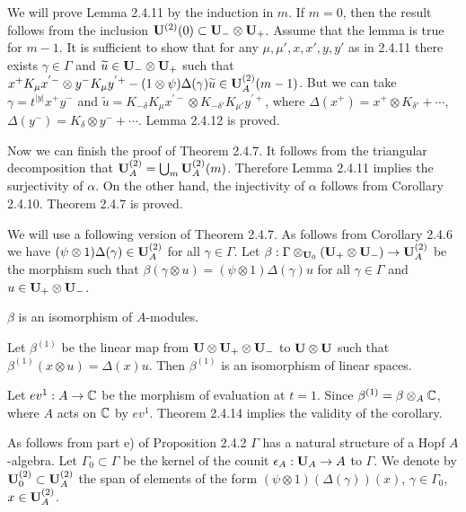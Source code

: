   We will prove Lemma 2.4.11 by the induction in $m$.
If  $m = 0$,  then the result follows from the inclusion ${\bold U}^{(2)}(0)
\subset {\bold U}_- \otimes {\bold U}_+$.  Assume that the lemma is true for
$m-1$.  It is sufficient
to show that for any  $\mu,\mu', x,x', y,y'$  as in 2.4.11 there exists
$\gamma \in \Gamma$  and  $\widetilde{u} \in {\bold U}_- \otimes {\bold U}_+$
such that $x^+K_\mu x^{'-} \otimes y^-K_\mu y^{'+} -
(1 \otimes \psi)\Delta(\gamma) \widetilde{u} \in
{\bold U}_A^{(2)} (m-1)$.  But we can take  $\gamma = t^{|y|} x^+y^-$  and
$\widetilde{u} = K_{-\delta} K_\mu x^{'-} \otimes K_{-\delta '}
K_{\mu'} y^{'+}$, where $\Delta(x^+) = x^+ \otimes K_{\delta '} + \cdots,$\
$\Delta(y^-) = K_\delta \otimes y^- + \cdots .$   Lemma 2.4.12 is proved.
\enddemo

\medpagebreak

   Now we can finish the proof of Theorem 2.4.7.  It follows
from the triangular decomposition that  ${\bold U}_A^{(2)} = \bigcup_m
{\bold U}_A^{(2)} (m)$.  Therefore Lemma 2.4.11 implies the surjectivity
of $\alpha$.  On the other hand, the injectivity of  $\alpha$  follows
from Corollary 2.4.10.  Theorem  2.4.7 is proved.

  We will use a following version of Theorem 2.4.7.  As
follows
from Corollary 2.4.6 we have $(\psi \otimes 1)\Delta(\gamma) \in {\bold
U}_A^{(2)}$ for all
$\gamma \in \Gamma$.  Let  $\beta: \Gamma \otimes_{{\bold U}_0}({\bold U}_+
\otimes {\bold U}_-) \to
{\bold U}_A^{(2)}$  be the morphism such that $\beta(\gamma \otimes u) =
(\psi \otimes 1)  \Delta(\gamma) u$  for all $\gamma \in \Gamma$ and
$u \in {\bold U}_+ \otimes {\bold U}_-$.

  $\beta$  is an isomorphism of $A$-modules.
\endproclaim

\medpagebreak

  Let  $\beta^{(1)}$  be the linear map
from  ${\bold U} \otimes {\bold U}_+ \otimes {\bold U}_-$  to ${\bold U}
\otimes {\bold U}$  such that
$\beta^{(1)}(x \otimes u) = \Delta(x)u$.  Then  $\beta^{(1)}$  is an
isomorphism of linear spaces.
\endproclaim

  Let  $ev^1: A \to {\Bbb C}$  be the morphism of evaluation at
$t = 1$.   Since  $\beta^{(1)} = \beta \otimes_A {\Bbb C}$,  where  $A$  acts
on ${\Bbb C}$  by  $ev^1$.  Theorem 2.4.14 implies the validity of the
 corollary.
\enddemo

  As follows from part e) of Proposition 2.4.2 $\Gamma$
has a natural structure of a Hopf $A$-algebra.  Let $\Gamma_0 \subset \Gamma$
be the kernel of the counit  $\epsilon_A: {\bold U}_A \to A$  to $\Gamma$.
We denote by  ${\bold U}_0^{(2)} \subset {\bold U}_A^{(2)}$  the span of
elements of the
form  $(\psi \otimes 1)(\Delta(\gamma))(x)$, $\gamma \in \Gamma_0$,
$x \in {\bold U}_A^{(2)}$.

